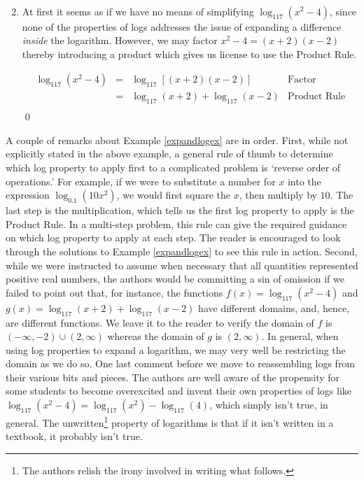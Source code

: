 \begin{ex}
\begin{enumerate}
\[\begin{array}{rclr}
\end{array} \]
\setlength{\extrarowheight}{2pt}

\item  At first it seems as if we have no means of simplifying $\log_{117}\left(x^2-4\right)$, since none of the properties of logs addresses the issue of expanding a difference \textit{inside} the logarithm.  However, we may factor $x^2 - 4 = (x+2)(x-2)$ thereby introducing a product which gives us license to use the Product Rule.

\setlength{\extrarowheight}{4pt}
\[ \begin{array}{rclr}

\log_{117}\left(x^2-4\right) & = & \log_{117} \left[(x+2)(x-2)\right] & \mbox{Factor} \\
														 & = & \log_{117}(x+2) + \log_{117}(x-2) & \mbox{Product Rule} \\
\end{array}\]
\setlength{\extrarowheight}{2pt}
\qed

\end{enumerate}

\end{ex}

A couple of remarks about Example \ref{expandlogex} are in order.  First, while not explicitly stated in the above example, a general rule of thumb to determine which log property to apply first to a complicated problem is `reverse order of operations.'  For example, if we were to substitute a number for $x$ into the expression $\log_{0.1} \left(10 x^2 \right)$, we would first square the $x$, then multiply by $10$.  The last step is the multiplication, which tells us the first log property to apply is the Product Rule.  In a multi-step problem, this rule can give the required guidance on which log property to apply at each step.  The reader is encouraged to look through the solutions to Example \ref{expandlogex} to see this rule in action.  Second, while we were instructed to assume when necessary that all quantities represented positive real numbers, the authors would be committing a sin of omission if we failed to point out that, for instance, the functions $f(x) = \log_{117}\left(x^2-4\right)$ and $g(x) = \log_{117}(x+2) + \log_{117}(x-2)$ have different domains, and, hence, are different functions. We leave it to the reader to verify the domain of $f$ is $(-\infty, -2) \cup (2,\infty)$ whereas the domain of $g$ is $(2,\infty)$.  In general, when using log properties to expand a logarithm, we may very well be restricting the domain as we do so.  One last comment before we move to reassembling logs from their various bits and pieces. The authors are well aware of the propensity for some students to become overexcited and invent their own properties of logs like $\log_{117}\left(x^2-4\right) = \log_{117}\left(x^2\right) - \log_{117}(4)$, which simply isn't true, in general.  The unwritten\footnote{The authors relish the irony involved in writing what follows.} property of logarithms is that if it isn't written in a textbook, it probably isn't true.    

